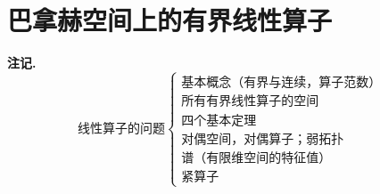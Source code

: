 \documentclass[12pt, a4paper, oneside]{ctexbook}
\newenvironment{note}{\par\noindent\textbf{注记. }}{\par}
\begin{document}
\chapter{巴拿赫空间上的有界线性算子}
\begin{note}
\begin{equation*}
	\textbf{线性算子的问题}\left\{\begin{matrix}
		\textbf{基本概念（有界与连续，算子范数）}\\ 
		\textbf{所有有界线性算子的空间}\\ 
		\textbf{四个基本定理}\\ 
		\textbf{对偶空间，对偶算子；弱拓扑}\\ 
		\textbf{谱（有限维空间的特征值）}\\ 
		\textbf{紧算子}
	\end{matrix}\right.
\end{equation*}
\end{note}
\end{document}
